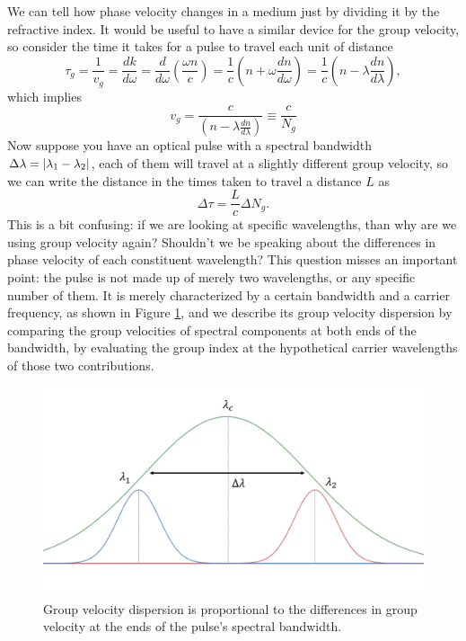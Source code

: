We can tell how phase velocity changes in a medium just by dividing it by the refractive index. It would be useful to have a similar device for the group velocity, so consider the time it takes for a pulse to travel each unit of distance
\begin{equation}
    \tau_g=\frac{1}{v_g}=\frac{dk}{d\omega}=\frac{d}{d\omega}\left(\frac{\omega n}{c}\right)=\frac{1}{c}\left(n+\omega\frac{dn}{d\omega}\right)=\frac{1}{c}\left(n-\lambda\frac{dn}{d\lambda}\right),
\end{equation}
which implies
\begin{equation}
    \boxed{v_g=\frac{c}{\left(n-\lambda\frac{dn}{d\lambda}\right)}\equiv\frac{c}{N_g}}
\end{equation}
Now suppose you have an optical pulse with a spectral bandwidth $\Delta\lambda=\abs{\lambda_1-\lambda_2}$, each of them will travel at a slightly different group velocity, so we can write the distance in the times taken to travel a distance $L$ as
\begin{equation}
    \Delta\tau=\frac{L}{c}\Delta N_g.
\end{equation}
This is a bit confusing: if we are looking at specific wavelengths, than why are we using group velocity again? Shouldn't we be speaking about the differences in phase velocity of each constituent wavelength? This question misses an important point: the pulse is not made up of merely two wavelengths, or any specific number of them. It is merely characterized by a certain bandwidth and a carrier frequency, as shown in Figure \ref{fig:GVD}, and we describe its group velocity dispersion by comparing the group velocities of spectral components at both ends of the bandwidth, by evaluating the group index at the hypothetical carrier wavelengths of those two contributions.
\begin{figure}[h]
    \centering
    \includegraphics[width=\linewidth]{Figuras/GVD.png}
    \caption{Group velocity dispersion is proportional to the differences in group velocity at the ends of the pulse's spectral bandwidth.}
    \label{fig:GVD}
\end{figure}


